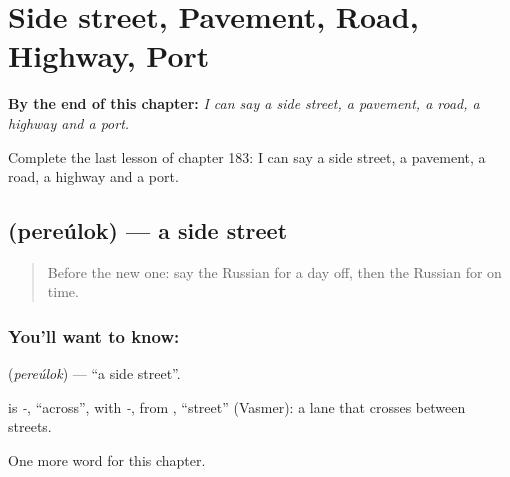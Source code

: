 
\chapter{Side street, Pavement, Road, Highway, Port}
\label{ch:ru-side-street-pavement-road-highway-port}

\begin{chapteropening}
\textbf{By the end of this chapter:} \emph{I can say a side street, a pavement, a road, a highway and a port.}

Complete the last lesson of chapter 183: I can say a side street, a pavement, a road, a highway and a port.
\end{chapteropening}

\section[\texorpdfstring{\ru{переулок} (pereúlok)}{переулок (pereúlok)}]{ (pereúlok) — a side street}

\label{lesson:RU-C183-pereulok}



\begin{quote}
Before the new one: say the Russian for a day off, then the Russian for on time.
\end{quote}

\subsection*{You'll want to know: }
\textbf{} (\emph{pereúlok}) — \textquotedblleft{}a side street\textquotedblright{}.

\begin{cousinweb}
\textbf{} is \emph{-}, \textquotedblleft{}across\textquotedblright{}, with \emph{-}, from \emph{}, \textquotedblleft{}street\textquotedblright{} (Vasmer): a lane that crosses between streets.
\end{cousinweb}

\begin{grammarlens}[title={What you've built}]
One more word for this chapter.
\end{grammarlens}

